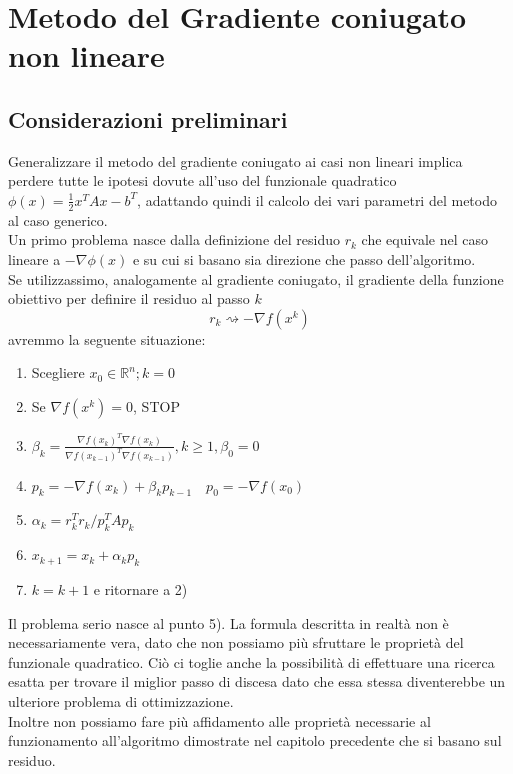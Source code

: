 \chapter{Metodo del Gradiente coniugato non lineare}

\section{Considerazioni preliminari} Generalizzare il metodo del
gradiente coniugato ai casi non lineari implica perdere tutte le
ipotesi dovute all'uso del funzionale quadratico $\phi(x) =
\frac{1}{2} x^{T} A x - b^{T}$, adattando quindi il calcolo dei vari
parametri del metodo al caso generico.\\

Un primo problema nasce dalla definizione del residuo $r_{k}$ che
equivale nel caso lineare a $-\nabla \phi(x)$ e su cui si basano sia
direzione che passo dell'algoritmo. \\

Se utilizzassimo, analogamente al gradiente coniugato, il gradiente
della funzione obiettivo per definire il residuo al passo $k$
 $$ r_{k}\rightsquigarrow -\nabla f(x^{k})$$
avremmo la seguente situazione:

\begin{enumerate}
 \item Scegliere $x_0 \in \mathbb{R}^{n}; k =0$
 \item Se $\nabla f(x^{k}) = 0$, STOP
 \item $\beta_{k} = \frac{\nabla f(x_{k})^{T} \nabla f(x_{k})} {\nabla
f(x_{k-1})^{T} \nabla f(x_{k-1})}, k \geq 1, \beta_{0} = 0$
 \item $p_{k} = -\nabla f(x_{k}) + \beta_{k} p_{k-1} \quad p_{0} =
-\nabla f(x_{0})$
 \item $\alpha_{k} = r_{k}^{T} r_{k} / p_{k}^{T}Ap_{k}$ \\
 \item $x_{k+1} = x_{k} +\alpha_{k} p_{k}$
 \item $k = k+1$ e ritornare a 2)
\end{enumerate} Il problema serio nasce al punto 5). La formula
descritta in realtà non \`e necessariamente vera, dato che non possiamo
più sfruttare le proprietà del funzionale quadratico. Ciò ci toglie
anche la possibilità di effettuare una ricerca esatta per trovare il
miglior passo di discesa dato che essa stessa diventerebbe un
ulteriore problema di ottimizzazione.\\ Inoltre non possiamo fare più
affidamento alle proprietà necessarie al funzionamento all'algoritmo
dimostrate nel capitolo precedente che si basano sul residuo. \\

